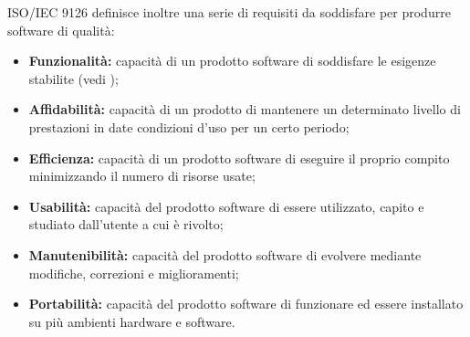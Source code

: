 ISO/IEC 9126 definisce inoltre una serie di requisiti da soddisfare per produrre software di qualità:
\begin{itemize}
	\item \textbf{Funzionalità: }capacità di un prodotto software di soddisfare le esigenze stabilite (vedi \AdR);
	\item \textbf{Affidabilità: }capacità di un prodotto di mantenere un determinato livello di prestazioni in date condizioni d'uso per un certo periodo;
	\item \textbf{Efficienza: }capacità di un prodotto software di eseguire il proprio compito minimizzando il numero di risorse usate;
	\item \textbf{Usabilità: }capacità del prodotto software di essere utilizzato, capito e studiato dall'utente a cui è rivolto;
	\item \textbf{Manutenibilità: }capacità del prodotto software di evolvere mediante modifiche, correzioni e miglioramenti;
	\item \textbf{Portabilità: }capacità del prodotto software di funzionare ed essere installato su più ambienti hardware e software.
\end{itemize}